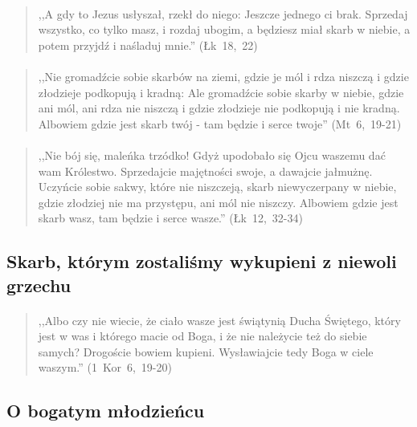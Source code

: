 \documentclass[10pt,a4paper,oneside]{article}
\begin{document}
\paragraph{}
\begin{quote}
,,A gdy to Jezus usłyszał, rzekł do niego: Jeszcze jednego ci brak. Sprzedaj wszystko, co tylko masz, i rozdaj ubogim, a będziesz miał skarb w niebie, a potem przyjdź i naśladuj mnie.'' \mbox{(Łk 18, 22)}
\end{quote}
\paragraph{}
\begin{quote}
,,Nie gromadźcie sobie skarbów na ziemi, gdzie je mól i rdza niszczą i gdzie złodzieje podkopują i kradną: Ale gromadźcie sobie skarby w niebie, gdzie ani mól, ani rdza nie niszczą i gdzie złodzieje nie podkopują i nie kradną. Albowiem gdzie jest skarb twój - tam będzie i serce twoje'' \mbox{(Mt 6, 19-21)}
\end{quote}
\paragraph{}
\begin{quote}
,,Nie bój się, maleńka trzódko! Gdyż upodobało się Ojcu waszemu dać wam Królestwo. Sprzedajcie majętności swoje, a dawajcie jałmużnę. Uczyńcie sobie sakwy, które nie niszczeją, skarb niewyczerpany w niebie, gdzie złodziej nie ma przystępu, ani mól nie niszczy. Albowiem gdzie jest skarb wasz, tam będzie i serce wasze.'' \mbox{(Łk 12, 32-34)}
\end{quote}
\subsection{Skarb, którym zostaliśmy wykupieni z niewoli grzechu}
\paragraph{}
\begin{quote}
,,Albo czy nie wiecie, że ciało wasze jest świątynią Ducha Świętego, który jest w was i którego macie od Boga, i że nie należycie też do siebie samych? Drogoście bowiem kupieni. Wysławiajcie tedy Boga w ciele waszym.'' \mbox{(1 Kor 6, 19-20)}
\end{quote}
\subsection{O bogatym młodzieńcu}
\end{document}
